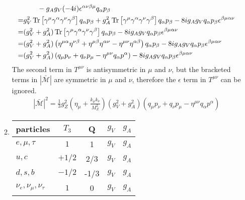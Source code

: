 \documentclass[12pt,a4]{article}
\begin{document}
\begin{enumerate}
\begin{enumerate}
\begin{align*}
                       & \qquad -  g_A g_V (-4 i)\epsilon^{\alpha \nu\beta \mu } q_\alpha p_\beta \\
                      =& g_V^2 \Tr\left[\gamma^\mu  \gamma^\alpha \gamma^\nu \gamma^\beta \right]q_\alpha p_\beta + g_A^2 \Tr\left[\gamma^\mu \gamma^\alpha \gamma^\nu \gamma^\beta  \right]q_\alpha  p_\beta - 8 i g_A g_V q_\alpha p_\beta \epsilon^{\beta \mu \alpha \nu} \\
                      =& (g_V^2 + g_A^2)\Tr\left[\gamma^\mu  \gamma^\alpha \gamma^\nu \gamma^\beta \right]q_\alpha p_\beta  - 8 i g_A g_V q_\alpha p_\beta \epsilon^{\beta \mu \alpha \nu} \\
                      =& (g_V^2 + g_A^2)\left(\eta^{\mu \alpha} \eta^{\nu \beta} + \eta^{\mu\beta}  \eta^{\alpha \nu} - \eta^{\mu\nu}  \eta^{\alpha\beta}\right) q_\alpha p_\beta  - 8 i g_A g_V q_\alpha p_\beta \epsilon^{\beta \mu \alpha \nu} \\
                      =& (g_V^2 + g_A^2)\left( q_\mu p_\nu +  q_\nu p_\mu - \eta^{\mu\nu}  q_\alpha p^\alpha\right)   - 8 i g_A g_V q_\alpha p_\beta \epsilon^{\beta \mu \alpha \nu} \\
        \end{align*}
        The second term in $T^{\mu \nu}$ is antisymmetric in $\mu$ and $\nu$, but the bracketed terms in $|\bar{\mathcal{M}}|$ are symmetric in $\mu$ and $\nu$, therefore the $\epsilon$ term in $T^{\mu\nu}$ can be ignored.
        \begin{align*}
          |\bar{\mathcal{M}}|^2 = \frac{1}{3} g_Z^2 \left(\eta_{\mu} + \frac{k_\mu k_\nu }{M_Z^2}\right) (g_V^2 + g_A^2)\left( q_\mu p_\nu +  q_\nu p_\mu - \eta^{\mu\nu}  q_\alpha p^\alpha\right)
        \end{align*}
      \item
        \begin{tabular}{l c c c c}
          \toprule
          particles         & $T_3$ & Q & $g_V$ & $g_A$ \\
          \midrule
          $e, \mu, \tau$    & $1$ & 1 & $g_V$ & $g_A$ \\
          $u, c        $    & $+1/2$ & 2/3 & $g_V$ & $g_A$ \\
          $d, s , b    $    & $-1/2$ & -1/3 & $g_V$ & $g_A$ \\
          $\nu_e, \nu_\mu, \nu_\tau   $ & $1$ & 0 & $g_V$ & $g_A$ \\
          \bottomrule
        \end{tabular}
    \end{enumerate}
\end{enumerate}
\end{document}
